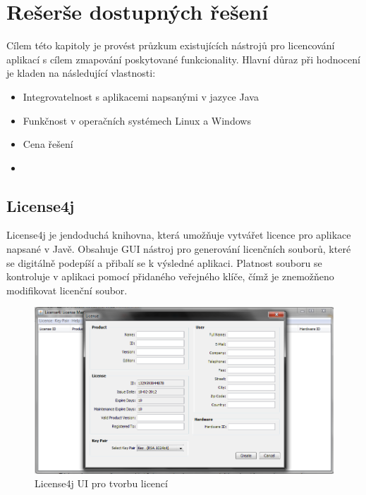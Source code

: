 \chapter{Rešerše dostupných řešení}

Cílem této kapitoly je provést průzkum existujících nástrojů pro licencování
aplikací s cílem zmapování poskytované funkcionality. Hlavní důraz při hodnocení
je kladen na následující vlastnosti:

\begin{itemize}
  \item Integrovatelnost s aplikacemi napsanými v jazyce Java
  \item Funkčnost v operačních systémech Linux a Windows
  \item Cena řešení 
  \item 
\end{itemize}


\section{License4j}

License4j\cite{license4j} je jendoduchá knihovna, která umožňuje vytvářet
licence pro aplikace napsané v Javě. Obsahuje GUI nástroj pro generování
licenčních souborů, které se digitálně podepíší a přibalí se k výsledné
aplikaci. Platnost souboru se kontroluje v aplikaci pomocí přidaného veřejného
klíče, čímž je znemožňeno modifikovat licenční soubor.

\begin{figure}[H]
\begin{center}
\includegraphics[width=16cm]{figures/license4j.PNG}
\caption{License4j UI pro tvorbu licencí}
\label{fig:license4j-ui} 
\end{center}
\end{figure}

